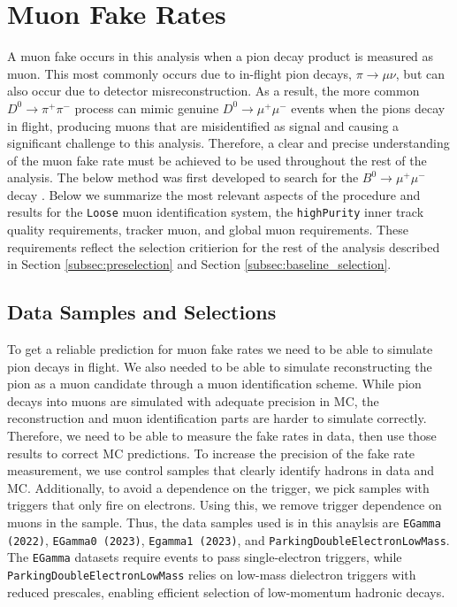 \section{Muon Fake Rates}
\label{sec:muon_fake_rate}

A muon fake occurs in this analysis when a pion decay product is measured as muon. This most commonly occurs due to in-flight pion decays, $\pi \to \mu \nu$, but can also occur due to detector misreconstruction. As a result, the more common $D^0 \to \pi^+ \pi^-$ process can mimic genuine $D^0 \to \mu^+ \mu^-$ events when the pions decay in flight, producing muons that are misidentified as signal and causing a significant challenge to this analysis. Therefore, a clear and precise understanding of the muon fake rate must be achieved to be used throughout the rest of the analysis. The below method was first developed to search for the $B^0 \to \mu^+ \mu^-$ decay \cite{ref:2023b0mumu}. Below we summarize the most relevant aspects of the procedure and results for the \texttt{Loose} muon identification system, the \texttt{highPurity} inner track quality requirements, tracker muon, and global muon requirements. These requirements reflect the selection critierion for the rest of the analysis described in Section \ref{subsec:preselection} and Section \ref{subsec:baseline_selection}.

\subsection{Data Samples and Selections}

To get a reliable prediction for muon fake rates we need to be able to simulate pion decays in flight. We also needed to be able to simulate reconstructing the pion as a muon candidate through a muon identification scheme. While pion decays into muons are simulated with adequate precision in MC, the reconstruction and muon identification parts are harder to simulate correctly. Therefore, we need to be able to measure the fake rates in data, then use those results to correct MC predictions. To increase the precision of the fake rate measurement, we use control samples that clearly identify hadrons in data and MC. Additionally, to avoid a dependence on the trigger, we pick samples with triggers that only fire on  electrons. Using this, we remove trigger dependence on muons in the sample. Thus, the data samples used is in this anaylsis are \texttt{EGamma (2022)}, \texttt{EGamma0 (2023)}, \texttt{Egamma1 (2023)}, and \texttt{ParkingDoubleElectronLowMass}. The \texttt{EGamma} datasets require events to pass single-electron triggers, while \texttt{ParkingDoubleElectronLowMass} relies on low-mass dielectron triggers with reduced prescales, enabling efficient selection of low-momentum hadronic decays.

